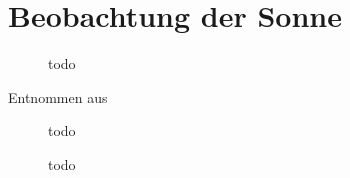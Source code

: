 \section{Beobachtung der Sonne}
\begin{figure}[H]
    \centering
    
    \caption{todo}
    \label{fig:Sonnenabbild}
\end{figure}
Entnommen aus
\cite{Karttunen2013}

\begin{figure}[H]
    \centering
    
    \caption{todo}
    \label{fig:Sonnenkreuz_Az}
\end{figure}

\begin{figure}[H]
    \centering
    
    \caption{todo}
    \label{fig:Sonnenkreuz_Alt}
\end{figure}